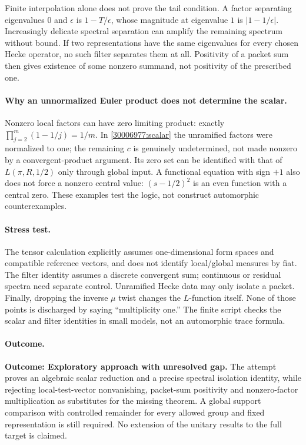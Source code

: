 \documentclass[11pt,a4paper]{article}
\numberwithin{equation}{section}
\begin{document}
Finite interpolation alone does not prove the tail condition. A factor
separating eigenvalues $0$ and $\epsilon$ is $1-T/\epsilon$, whose magnitude
at eigenvalue $1$ is $|1-1/\epsilon|$. Increasingly delicate spectral
separation can amplify the remaining spectrum without bound. If two
representations have the same eigenvalues for every chosen Hecke operator,
no such filter separates them at all. Positivity of a packet sum then gives
existence of some nonzero summand, not positivity of the prescribed one.

\paragraph{Why an unnormalized Euler product does not determine the scalar.}
Nonzero local factors can have zero limiting product: exactly
$\prod_{j=2}^m(1-1/j)=1/m$. In \eqref{30006977:scalar} the unramified factors
were normalized to one; the remaining $c$ is genuinely undetermined, not
made nonzero by a convergent-product argument. Its zero set can be identified
with that of $L(\pi,R,1/2)$ only through global input. A functional equation
with sign $+1$ also does not force a nonzero central value: $(s-1/2)^2$ is an
even function with a central zero. These examples test the logic, not
construct automorphic counterexamples.

\paragraph{Stress test.}
The tensor calculation explicitly assumes one-dimensional form spaces and
compatible reference vectors, and does not identify local/global measures
by fiat. The filter identity assumes a discrete convergent sum; continuous
or residual spectra need separate control. Unramified Hecke data may only
isolate a packet. Finally, dropping the inverse $\mu$ twist changes the
$L$-function itself. None of those points is discharged by saying
``multiplicity one.'' The finite script checks the scalar and filter
identities in small models, not an automorphic trace formula.

\paragraph{Outcome.}
\textbf{Outcome: Exploratory approach with unresolved gap.}
The attempt proves an algebraic scalar reduction and a precise spectral
isolation identity, while rejecting local-test-vector nonvanishing,
packet-sum positivity and nonzero-factor multiplication as substitutes for
the missing theorem. A global support comparison with controlled remainder
for every allowed group and fixed representation is still required. No
extension of the unitary results to the full target is claimed.
\end{document}
